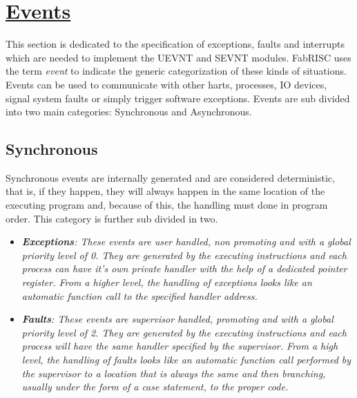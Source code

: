 \section[Events]{\LARGE\underline{Events}}

    \vspace{10pt}

    This section is dedicated to the specification of exceptions, faults and interrupts which are needed to implement the UEVNT and SEVNT modules. FabRISC uses the term \textit{event} to indicate the generic categorization of these kinds of situations. Events can be used to communicate with other harts, processes, IO devices, signal system faults or simply trigger software exceptions. Events are sub divided into two main categories: Synchronous and Asynchronous.

    \subsection{Synchronous}

        \vspace{10pt}

        Synchronous events are internally generated and are considered deterministic, that is, if they happen, they will always happen in the same location of the executing program and, because of this, the handling must done in program order. This category is further sub divided in two.

        \begin{itemize}

            \item \textit{\textbf{Exceptions}: These events are user handled, non promoting and with a global priority level of 0. They are generated by the executing instructions and each process can have it's own private handler with the help of a dedicated pointer register. From a higher level, the handling of exceptions looks like an automatic function call to the specified handler address.}

            \item \textit{\textbf{Faults}: These events are supervisor handled, promoting and with a global priority level of 2. They are generated by the executing instructions and each process will have the same handler specified by the supervisor. From a high level, the handling of faults looks like an automatic function call performed by the supervisor to a location that is always the same and then branching, usually under the form of a case statement, to the proper code.}

        \end{itemize}

